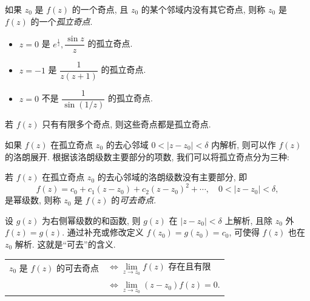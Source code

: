 \documentclass[nocolor,theme=doremi,lang=cn,11pt,chinese,twoside,openright,usesamecnt]{elegantbook}
\begin{document}
\begin{definition}
	如果 $z_0$ 是 $f(z)$ 的一个奇点, 且 $z_0$ 的某个邻域内没有其它奇点, 则称 $z_0$ 是 $f(z)$ 的一个\emph{孤立奇点}.
\end{definition}

\begin{example}
	\begin{itemize}
		\item $z=0$ 是 $e^{\frac1z},\dfrac{\sin z}z$ 的孤立奇点.
		\item $z=-1$ 是 $\dfrac1{z(z+1)}$ 的孤立奇点.
		\item $z=0$ 不是 $\dfrac1{\sin(1/z)}$ 的孤立奇点.
	\end{itemize}
\end{example}

若 $f(z)$ 只有有限多个奇点, 则这些奇点都是孤立奇点.

如果 $f(z)$ 在孤立奇点 $z_0$ 的去心邻域 $0<|z-z_0|<\delta$ 内解析, 则可以作 $f(z)$ 的洛朗展开.
根据该洛朗级数主要部分的项数, 我们可以将孤立奇点分为三种:

\begin{definition}
	若 $f(z)$ 在孤立奇点 $z_0$ 的去心邻域的洛朗级数没有主要部分, 即
	\[f(z)=c_0+c_1(z-z_0)+c_2(z-z_0)^2+\cdots,\quad 0<|z-z_0|<\delta,\]
	是幂级数, 则称 $z_0$ 是 $f(z)$ 的\emph{可去奇点}.
\end{definition}

设 $g(z)$ 为右侧幂级数的和函数, 则 $g(z)$ 在 $|z-z_0|<\delta$ 上解析,
且除 $z_0$ 外 $f(z)=g(z)$.
通过补充或修改定义 $f(z_0)=g(z_0)=c_0$, 可使得 $f(z)$ 也在 $z_0$ 解析.
这就是``可去''的含义.

\begin{theorem}
	\begin{tabular}{rl}
		$z_0$ 是 $f(z)$ 的可去奇点
		&$\iff\lim\limits_{z\to z_0}f(z)$ 存在且有限\\
		&$\iff\lim\limits_{z\to z_0}(z-z_0)f(z)=0$.
	\end{tabular}
\end{theorem}
\end{document}
